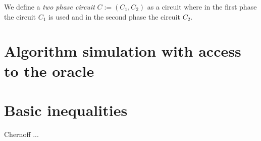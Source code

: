 We define a \textit{two phase circuit} $C := (C_1, C_2)$ as a circuit where in the first phase the circuit $C_1$
is used and in the second phase the circuit $C_2$.

\section{Algorithm simulation with access to the oracle}

\section{Basic inequalities}
Chernoff ...
